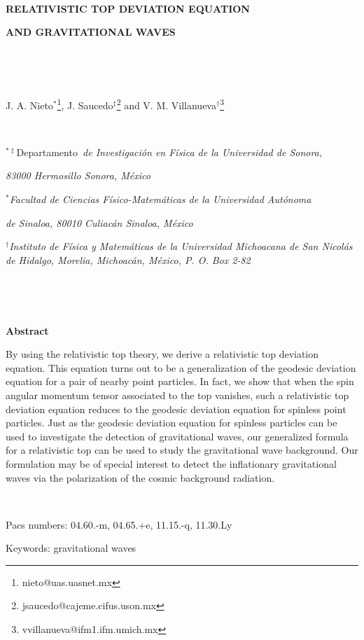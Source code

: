 \documentclass[a4paper,12pt]{article}
\begin{document}
\bigskip\ 

\begin{center}
\textbf{RELATIVISTIC TOP DEVIATION EQUATION }

\textbf{AND GRAVITATIONAL WAVES}

\bigskip\ 

\smallskip\ 

J. A. Nieto$^{\ast }$\footnote{%
nieto@uas.uasnet.mx}, J. Saucedo$^{\ddagger }$\footnote{%
jsaucedo@cajeme.cifus.uson.mx} and V. M. Villanueva$^{\dagger }$\footnote{%
vvillanueva@ifm1.ifm.umich.mx}

\smallskip\ 

$^{\ast \ddagger }$Departamento\textit{\ de Investigaci\'{o}n en F\'{i}sica
de la Universidad de Sonora,}

\textit{83000 Hermosillo Sonora, M\'{e}xico}

$^{\ast }$\textit{Facultad de Ciencias F\'{i}sico-Matem\'{a}ticas de la
Universidad Aut\'{o}noma}

\textit{de Sinaloa, 80010 Culiac\'{a}n Sinaloa, M\'{e}xico}

$^{\dagger }$\textit{Instituto de F\'{i}sica y Matem\'{a}ticas de la
Universidad Michoacana de San Nicol\'{a}s de Hidalgo, Morelia,
Michoac\'{a}n, M\'{e}xico, P. O. Box 2-82}

\textit{\ }

\bigskip\ 

\textbf{Abstract}
\end{center}

By using the relativistic top theory, we derive a relativistic top deviation
equation. This equation turns out to be a generalization of the geodesic
deviation equation for a pair of nearby point particles. In fact, we show
that when the spin angular momentum tensor associated to the top vanishes,
such a relativistic top deviation equation reduces to the geodesic deviation
equation for spinless point particles. Just as the geodesic deviation
equation for spinless particles can be used to investigate the detection of
gravitational waves, our generalized formula for a relativistic top can be
used to study the gravitational wave background. Our formulation may be of
special interest to detect the inflationary gravitational waves via the
polarization of the cosmic background radiation.

\bigskip\ 

Pacs numbers: 04.60.-m, 04.65.+e, 11.15.-q, 11.30.Ly

Keywords: gravitational waves
\end{document}
